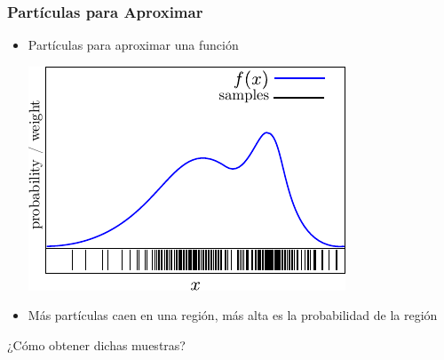\begin{frame}
    \frametitle{Partículas para Aproximar}
    
    \begin{itemize}
        \item Partículas para aproximar una función
        
        \begin{center}
            \includegraphics[width=0.8\columnwidth]{./images/particle_filter/particles_for_approximation.pdf}
        \end{center}

        \item Más partículas caen en una región, más alta es la probabilidad de la región
    \end{itemize}
    
    \begin{center}
        \alert{¿Cómo obtener dichas muestras?}
    \end{center}

\end{frame}

